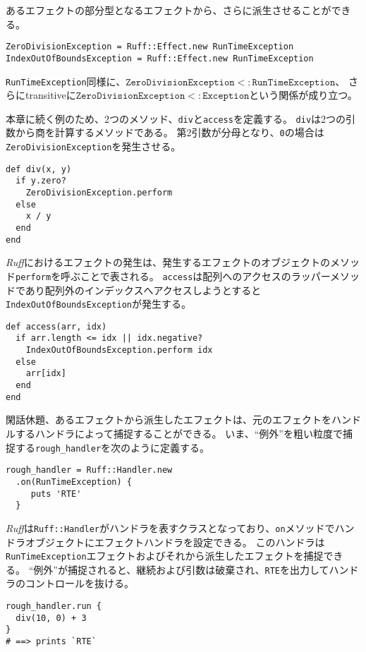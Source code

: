 \documentclass{ltjsarticle}
\begin{document}
あるエフェクトの部分型となるエフェクトから、さらに派生させることができる。
\begin{lstlisting}
ZeroDivisionException = Ruff::Effect.new RunTimeException
IndexOutOfBoundsException = Ruff::Effect.new RunTimeException
\end{lstlisting}
\lstinline{RunTimeException}同様に、$\mathtt{ZeroDivisionException} <: \mathtt{RunTimeException}$、%
  さらにtransitiveに$\mathtt{ZeroDivisionException} <: \mathtt{Exception}$という関係が成り立つ。

本章に続く例のため、2つのメソッド、\lstinline{div}と\lstinline{access}を定義する。
\lstinline{div}は2つの引数から商を計算するメソッドである。
第2引数が分母となり、\lstinline{0}の場合は\lstinline{ZeroDivisionException}を発生させる。
\begin{lstlisting}
def div(x, y)
  if y.zero?
    ZeroDivisionException.perform
  else
    x / y
  end
end
\end{lstlisting}
\textit{Ruff}におけるエフェクトの発生は、発生するエフェクトのオブジェクトのメソッド\lstinline{perform}を呼ぶことで表される。
\lstinline{access}は配列へのアクセスのラッパーメソッドであり配列外のインデックスへアクセスしようとすると\lstinline{IndexOutOfBoundsException}が発生する。
\begin{lstlisting}
def access(arr, idx)
  if arr.length <= idx || idx.negative?
    IndexOutOfBoundsException.perform idx
  else
    arr[idx]
  end
end
\end{lstlisting}

閑話休題、あるエフェクトから派生したエフェクトは、元のエフェクトをハンドルするハンドラによって捕捉することができる。
いま、``例外''を粗い粒度で捕捉する\lstinline{rough_handler}を次のように定義する。
\begin{lstlisting}
rough_handler = Ruff::Handler.new
  .on(RunTimeException) {
     puts 'RTE'
  }
\end{lstlisting}
\textit{Ruff}は\lstinline{Ruff::Handler}がハンドラを表すクラスとなっており、\lstinline{on}メソッドでハンドラオブジェクトにエフェクトハンドラを設定できる。
このハンドラは\lstinline{RunTimeException}エフェクトおよびそれから派生したエフェクトを捕捉できる。
``例外''が捕捉されると、継続および引数は破棄され、\lstinline{RTE}を出力してハンドラのコントロールを抜ける。
\begin{lstlisting}
rough_handler.run {
  div(10, 0) + 3
}
# ==> prints `RTE`
\end{lstlisting}
\end{document}
